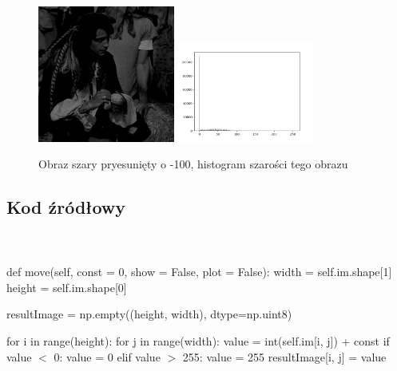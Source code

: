 \documentclass[final,a4paper,openany,12pt]{mwbk}
\begin{document}
\begin{figure}[H]
	\begin{center}
		\includegraphics[width=0.4\textwidth]{pirate_gray_moveHist_result}
		\includegraphics[width=0.4\textwidth]{pirate_gray_moveHist_histogram}
	\end{center}
	\caption{Obraz szary pryesunięty o -100, histogram szarości tego obrazu}
\end{figure}



\subsection*{Kod źródłowy}
\hfill
\\\\
\noindent def move(self, const = 0, show = False, plot = False): \newline
\indent width = self.im.shape[1] \newline
\indent height = self.im.shape[0] \newline

resultImage = np.empty((height, width), dtype=np.uint8) \newline

for i in range(height): \newline
\indent for j in range(width): \newline
\indent value = int(self.im[i, j]) + const \newline
\indent if value $<$ 0: \newline
\indent value = 0 \newline
elif value $>$ 255: \newline
value = 255 \newline
resultImage[i, j] = value \newline
\end{document}
